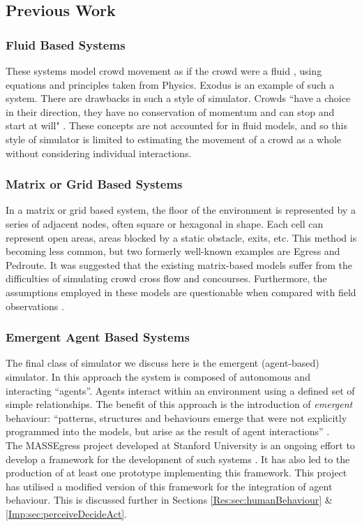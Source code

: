 \subsection{Previous Work}

\subsubsection{Fluid Based Systems}
These systems model crowd movement as if the crowd were a fluid \cite{WikipediaFluidMechanics}, using equations and principles taken from Physics. 
Exodus \cite{GaleaNumericalSimulation,GaleaMathModelling} is an example of such a system. There are drawbacks in such a style 
of simulator. Crowds ``have a choice in their direction, they have no conservation of momentum and can stop and start at will" \cite{StillCrowdDynamics}. 
These concepts are not accounted for in fluid models, and so this style of simulator is limited to estimating the movement of a crowd as a whole without
considering individual interactions.

\subsubsection{Matrix or Grid Based Systems}
In a matrix or grid based system, the floor of the environment is represented by a series of adjacent nodes, often square or hexagonal in shape. Each 
cell can represent open areas, areas blocked by a static obstacle, exits, etc. This method is becoming less common, but two formerly well-known examples are 
Egress and Pedroute. It was suggested that the existing matrix-based models suffer from the
difficulties of simulating crowd cross flow and concourses. Furthermore, the
assumptions employed in these models are questionable when compared with field observations \cite{StillCrowdDynamics}.

\subsubsection{Emergent Agent Based Systems}
The final class of simulator we discuss here is the emergent (agent-based) simulator. In this approach the system is composed of autonomous
and interacting ``agents''. Agents interact within an environment using a defined set of simple relationships. The benefit of this approach is the introduction
of \emph{emergent} behaviour: ``patterns, structures and behaviours emerge that were not explicitly programmed into the models, but arise as the 
result of agent interactions'' \cite{AgentBasedTutorial}.\\
The MASSEgress project developed at Stanford University is an ongoing effort to develop a framework for the development of such systems \cite{MultiAgentFramework}.
It has also led to the production of at least one prototype implementing this framework. 
This project has utilised a modified version of this framework for the integration
of agent behaviour. This is discussed further in Sections \ref{Res:sec:humanBehaviour} \& \ref{Imp:sec:perceiveDecideAct}.


